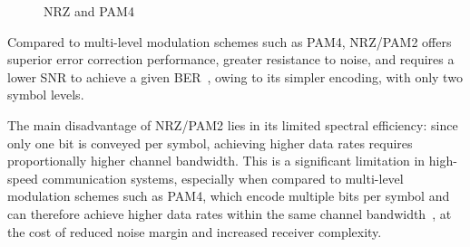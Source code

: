 \begin{figure}[H]
    \caption{NRZ and PAM4}\label{fig:nrz_and_pam4}
\end{figure}

Compared to multi-level modulation schemes such as \ac{PAM4}, \ac{NRZ}/\ac{PAM2} offers superior error correction performance, greater resistance to noise, and requires a lower \ac{SNR} to achieve a given \ac{BER}~\cite{razavi_NRZ_PAM4,zamir2018_nrz_pam4}, owing to its simpler encoding, with only two symbol levels.


The main disadvantage of \ac{NRZ}/\ac{PAM2} lies in its limited spectral efficiency: since only one bit is conveyed per symbol, achieving higher data rates requires proportionally higher channel bandwidth. This is a significant limitation in high-speed communication systems, especially when compared to multi-level modulation schemes such as \ac{PAM4}, which encode multiple bits per symbol and can therefore achieve higher data rates within the same channel bandwidth~\cite{razavi_NRZ_PAM4,chen_cml_review_2026}, at the cost of reduced noise margin and increased receiver complexity.  


